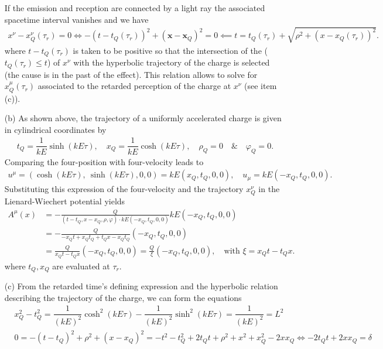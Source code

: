 \documentclass[10pt, a4paper]{article}
\begin{document}
\begin{enumerate}
 If the emission and reception are connected by a light ray the associated spacetime interval vanishes and we have 
 \begin{align*}
  x^{\nu} - x^\nu_Q(\tau_r) = 0 \iff -(t-t_Q(\tau_r))^2+(\mathbf{x}-\boldsymbol{x}_Q)^2 = 0 \impliedby t = t_Q(\tau_r) + \sqrt{\rho^2 + (x-x_Q(\tau_r))^2}.
 \end{align*}
 where $t - t_Q(\tau_r)$ is taken to be positive so that the intersection of the  ($t_Q(\tau_r) \leq t$) of $x^{\nu}$ with the hyperbolic trajectory of the charge is selected (the cause is in the past of the effect). This relation allows to solve for $x_Q^{\mu}(\tau_r)$ associated to the retarded perception of the charge at $x^{\nu}$ (see item (c)). 
  \item[(b)] As shown above, the trajectory of a uniformly accelerated charge is given in cylindrical coordinates by
  \begin{align*}
    t_Q = \dfrac{1}{kE}\sinh(kE \tau), \quad x_Q = \dfrac{1}{kE}\cosh(kE \tau),\quad \rho_Q = 0\quad \& \quad \varphi_Q = 0. 
  \end{align*}
  Comparing the four-position with four-velocity leads to 
  \begin{align*}
    u^\mu = (\cosh(kE \tau),\ \sinh(kE \tau), 0, 0) = kE (x_Q, t_Q, 0, 0), \quad u_\mu = kE (-x_Q, t_Q, 0, 0).
  \end{align*}
  Substituting this expression of the four-velocity and the trajectory $x^\nu_Q$ in the Lienard-Wiechert potential yields
  \begin{align*}
    A^\mu(x)&=-\frac{Q}{\left(t-t_Q, x-x_Q, \rho, \varphi\right) \cdot kE (-x_Q, t_Q, 0, 0)} kE (-x_Q, t_Q, 0, 0)\\
    &=-\frac{Q}{- x_Q t+ x_Qt_Q + t_Qx-x_Qt_Q}  (-x_Q, t_Q, 0, 0)\\
    &=\frac{Q}{x_Q t - t_Q x}  (-x_Q, t_Q, 0, 0) = \frac{Q}{\xi}  (-x_Q, t_Q, 0, 0), \quad \text{with $\xi = x_Q t - t_Qx$}.
 \end{align*}
 where $t_Q, x_Q$ are evaluated at $\tau_r$.
  \item[(c)] From the retarded time's defining expression and the hyperbolic relation describing the trajectory of the charge, we can form the equations  
  \begin{align*}
    &x_Q^2 - t_Q^2 = \dfrac{1}{(kE)^2}\cosh^2(kE \tau) - \dfrac{1}{(kE)^2}\sinh^2(kE \tau) = \dfrac{1}{(kE)^2} = L^2 \\
    &0=-(t-t_Q)^2 + \rho^2 + (x-x_Q)^2 = - t^2 - t_Q^2 + 2t_Qt + \rho^2 + x^2+x_Q^2 - 2x x_Q \iff  -2t_Qt + 2x x_Q = \delta

\end{align*}
\end{enumerate}
\end{document}
